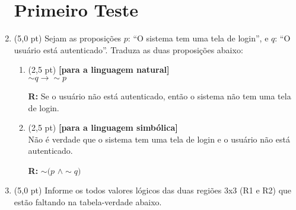 \documentclass[12pt,a4paper,oneside]{article}
\begin{document}
\begin{enumerate}
	
	\section*{Primeiro Teste}
	
	\item (5,0 pt) Sejam as proposições $p$: ``O sistema tem uma tela de login'', e $q$: ``O usuário está autenticado''. Traduza as duas proposições abaixo:
	\begin{enumerate}
		\item (2,5 pt) {\bf [para a linguagem natural]} \\$\sim q \rightarrow \sim p$
		
		\vspace*{0.3cm}
		
		{ \color{blue} {\bf R:} Se o usuário não está autenticado, então o sistema não tem uma tela de login.}
		
		\vspace*{0.3cm}
		
		\item (2,5 pt) {\bf [para a linguagem simbólica]} \\Não é verdade que o sistema tem uma tela de login e o usuário não está autenticado.
		
		\vspace*{0.3cm}
		
		{ \color{blue} {\bf R:} $\sim (p$ $\wedge \sim q)$}
		
	\end{enumerate}
	
	\newpage
	
	\item (5,0 pt) Informe os todos valores lógicos das duas regiões 3x3 (R1 e R2) que estão faltando na tabela-verdade abaixo.
	

\end{enumerate}
\end{document}
